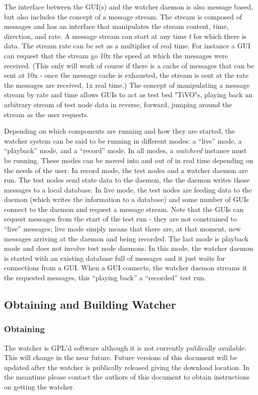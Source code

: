 \documentclass{article}
\begin{document}
The interface between the GUI(s) and the watcher daemon is also message based, but also includes the concept of a message
stream. The stream is composed of messages and has an interface that manipulates the stream content, time, direction, and rate. A message
stream can start at any time {\it t} for which there is data. The stream rate can be set as a multiplier of real time. For instance
a GUI can request that the stream go 10x the speed at which the messages were received. (This only will work of course if there is 
a cache of messages that can be sent at 10x - once the message cache is exhausted, the stream is sent at the rate the messages
are received, 1x real time.) The concept of manipulating a message stream by rate and time allows GUIs to act as test bed "TiVO"s, playing 
back an arbitrary stream of test node data in reverse, forward, jumping around the stream as the user requests. 

Depending on which components are running and how they are started, the watcher system can be said to be running in different modes: a ``live'' mode, 
a ``playback'' mode, and a ``record'' mode. In all modes, a {\it watcherd} instance must be running.  These modes
can be moved into and out of in real time depending on the needs of the user. In record mode, the test nodes and a watcher daemon are
run. The test nodes send state data to the daemon, the the daemon writes those messages to a local database. In live mode, the test 
nodes are feeding data to the daemon (which writes the information to a database) and some number of GUIs connect to the 
daemon and request a message stream. Note that the GUIs can request messages from the start of the test run - they are not
constrained to ``live'' messages; live mode simply means that there are, at that moment, new messages arriving at the daemon
and being recorded. The last mode is playback mode and does not involve test node daemons. In this mode, the watcher daemon
is started with an existing database full of messages and it just waits for connections from a GUI. When a GUI connects, the 
watcher daemon streams it the requested messages, this ``playing back'' a ``recorded'' test run. 

\subsection{Obtaining and Building Watcher}
\subsubsection{Obtaining}
The watcher is GPL'd software although it is not currently publically available. This will change in the near future. Future versions of this 
document will be updated after the watcher is publically released giving the download location. In the meantime please contact the authors 
of this document to obtain instructions on getting the watcher. 
\end{document}
